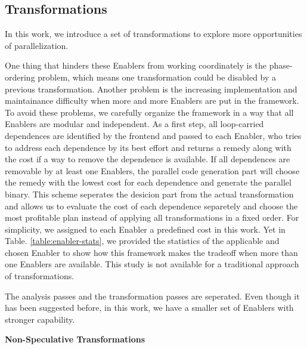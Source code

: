 
\subsection{Transformations}
\label{sec:transformations}

In this work, we introduce a set of transformations to explore more
opportunities of parallelization.



One thing that hinders these Enablers from working coordinately is
the phase-ordering problem, which means one transformation could be disabled
by a previous transformation. Another problem is the increasing
implementation and maintainance difficulty when more and more Enablers are
put in the framework. To avoid these problems, we carefully organize the
framework in a way that all Enablers are modular and independent. As a first
step, all loop-carried dependences are identified by the frontend and passed
to each Enabler, who tries to address each dependence by its best effort and
returns a remedy along with the cost if a way to remove the dependence is
available. If all dependences are removable by at least one Enablers, the
parallel code generation part will choose the remedy with the lowest cost
for each dependence and generate the parallel binary. This scheme seperates
the desicion part from the actual transformation and allows us to evaluate
the cost of each dependence separetely and choose the most profitable plan
instead of applying all transformations in a fixed order. For simplicity, we
assigned to each Enabler a predefined cost in this work. Yet in Table.
\ref{table:enabler-stats}, we provided the statistics of the applicable and
chosen Enabler to show how this framework makes the tradeoff when more than
one Enablers are available. This study is not available for a traditional
approach of transformations.

The analysis passes and the transformation passes are seperated. Even though
it has been suggested before, in this work, we have a smaller set of
Enablers with stronger capability.

\textbf{Non-Speculative Transformations}

